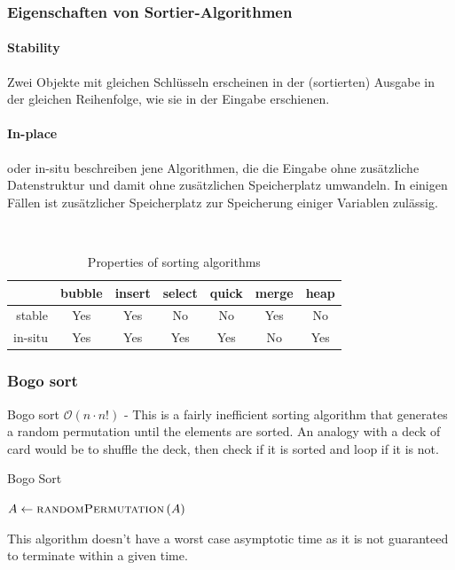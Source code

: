 \documentclass[a4paper]{article}
\begin{document}
\subsubsection{Eigenschaften von Sortier-Algorithmen}

\paragraph{Stability} Zwei Objekte mit gleichen Schlüsseln erscheinen in der (sortierten) Ausgabe in der gleichen Reihenfolge, wie sie in der Eingabe erschienen.
\paragraph{In-place} oder in-situ beschreiben jene Algorithmen, die die Eingabe ohne zusätzliche Datenstruktur und damit ohne zusätzlichen Speicherplatz umwandeln. In einigen Fällen ist zusätzlicher Speicherplatz zur Speicherung einiger Variablen zulässig.

\begin{table}[H]
\centering
\caption{Properties of sorting algorithms}
\label{my-label}
~\\
\begin{tabular}{|r|c|c|c|c|c|c|@{}}
  \cline{2-7}
  \multicolumn{1}{c|}{} & \textbf{bubble} & \textbf{insert} & \textbf{select} & \textbf{quick} & \textbf{merge} & \textbf{heap} \\
        \hline
stable  & Yes      & Yes      & No      & No     & Yes     & No    \\
  in-situ & Yes      & Yes      & Yes      & Yes     & No     & Yes   \\
  \hline
\end{tabular}
\end{table}


\subsubsection{Bogo sort}
Bogo sort $\mathcal{O}(n\cdot n!)$ - This is a fairly inefficient sorting algorithm that generates a random permutation until the elements are sorted. An analogy with a deck of card would be to shuffle the deck, then check if it is sorted and loop if it is not. 


\begin{algorithm}
    \caption{Bogo Sort}
    \label{alg:BogoSort}
    \begin{algorithmic}
        \State $A \gets \textsc{randomPermutation}\left(A\right)$
        \EndWhile
    \end{algorithmic}
\end{algorithm}
This algorithm doesn't have a worst case asymptotic time as it is not guaranteed to terminate within a given time. 
\end{document}

